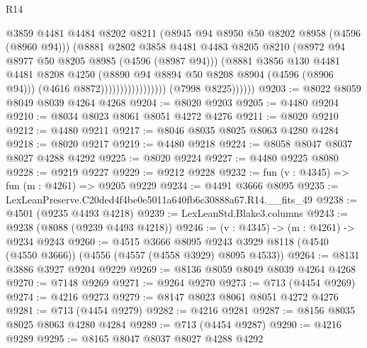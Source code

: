 \begin{lexlean}{R14}
\begin{coremodule}
                                          @3859
                                          @4481
                                          @4484
                                          @8202
                                          @8211
                                          (@8945 @94 @8950 @50 @8202 @8958 (@4596 (@8960 @94)))
                                          (@8881
                                            @2802
                                            @3858
                                            @4481
                                            @4483
                                            @8205
                                            @8210
                                            (@8972 @94 @8977 @50 @8205 @8985 (@4596 (@8987 @94)))
                                            (@8881
                                              @3856
                                              @130
                                              @4481
                                              @4481
                                              @8208
                                              @4250
                                              (@8890 @94 @8894 @50 @8208 @8904 (@4596 (@8906 @94)))
                                              (@4616 @8872)))))))))))))))))
              (@7998 @8225))))))
@9203 := @8022 @8059 @8049 @8039 @4264 @4268
@9204 := @8020 @9203
@9205 := @4480 @9204
@9210 := @8034 @8023 @8061 @8051 @4272 @4276
@9211 := @8020 @9210
@9212 := @4480 @9211
@9217 := @8046 @8035 @8025 @8063 @4280 @4284
@9218 := @8020 @9217
@9219 := @4480 @9218
@9224 := @8058 @8047 @8037 @8027 @4288 @4292
@9225 := @8020 @9224
@9227 := @4480 @9225 @8080
@9228 := @9219 @9227
@9229 := @9212 @9228
@9232 := fun (v : @4345) => fun (m : @4261) => @9205 @9229
@9234 := @4491 @3666 @8095
@9235 := LexLeanPreserve.C20ded4f4be0e5011a640fb6c30888a67.R14.__fits_49
@9238 := @4501 (@9235 @4493 @4218)
@9239 := LexLeanStd.Blake3.columns
@9243 := @9238 (@8088 (@9239 @4493 @4218))
@9246 := (v : @4345) -> (m : @4261) -> @9234 @9243
@9260 := @4515
    @3666
    @8095
    @9243
    @3929
    @8118
    (@4540 (@4550 @3666))
    (@4556 (@4557 (@4558 @3929) @8095 @4533))
@9264 := @8131 @3886 @3927 @9204 @9229
@9269 := @8136 @8059 @8049 @8039 @4264 @4268
@9270 := @7148 @9269
@9271 := @9264 @9270
@9273 := @713 (@4454 @9269)
@9274 := @4216 @9273
@9279 := @8147 @8023 @8061 @8051 @4272 @4276
@9281 := @713 (@4454 @9279)
@9282 := @4216 @9281
@9287 := @8156 @8035 @8025 @8063 @4280 @4284
@9289 := @713 (@4454 @9287)
@9290 := @4216 @9289
@9295 := @8165 @8047 @8037 @8027 @4288 @4292

\end{coremodule}
\end{lexlean}
